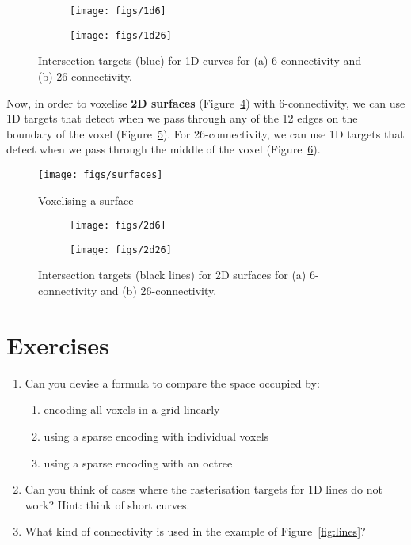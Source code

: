\begin{figure}
\centering
\begin{subfigure}[b]{0.45\linewidth}
\texttt{[image: figs/1d6]}
\caption{}%
\label{subfig:1d6}
\end{subfigure}
\quad
\begin{subfigure}[b]{0.45\linewidth}
\texttt{[image: figs/1d26]}
\caption{}%
\label{subfig:1d26}
\end{subfigure}
\caption{Intersection targets (blue) for 1D curves for (a) 6-connectivity and (b) 26-connectivity.}%
\label{fig:1d}
\end{figure}

Now, in order to voxelise \textbf{2D surfaces} (Figure~\ref{fig:surfaces}) with 6-connectivity, we can use 1D targets that detect when we pass through any of the 12 edges on the boundary of the voxel (Figure~\ref{subfig:2d6}).
For 26-connectivity, we can use 1D targets that detect when we pass through the middle of the voxel (Figure~\ref{subfig:2d26}).

\begin{figure}
\centering
\texttt{[image: figs/surfaces]}
\caption{Voxelising a surface}%
\label{fig:surfaces}
\end{figure}

\begin{figure}
\centering
\begin{subfigure}[b]{0.45\linewidth}
\texttt{[image: figs/2d6]}
\caption{}%
\label{subfig:2d6}
\end{subfigure}
\quad
\begin{subfigure}[b]{0.45\linewidth}
\texttt{[image: figs/2d26]}
\caption{}%
\label{subfig:2d26}
\end{subfigure}
\caption{Intersection targets (black lines) for 2D surfaces for (a) 6-connectivity and (b) 26-connectivity.}%
\label{fig:2d}
\end{figure}

%
\section{Exercises}

\begin{enumerate}
	\item Can you devise a formula to compare the space occupied by:
	\begin{enumerate}
		\item encoding all voxels in a grid linearly
		\item using a sparse encoding with individual voxels
		\item using a sparse encoding with an octree
	\end{enumerate}
	\item Can you think of cases where the rasterisation targets for 1D lines do not work? Hint: think of short curves.
	\item What kind of connectivity is used in the example of Figure~\ref{fig:lines}?
\end{enumerate}



